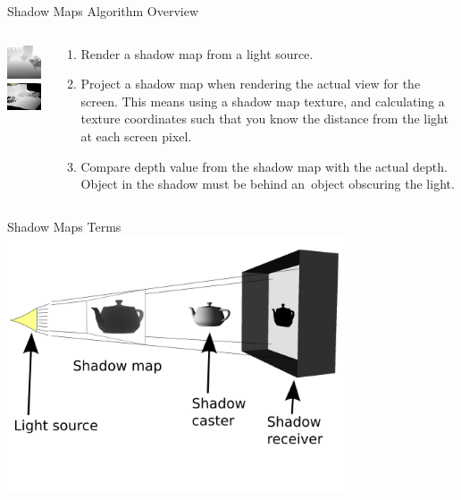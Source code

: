 \documentclass{beamer}
\begin{document}
\begin{frame}{Shadow Maps Algorithm Overview}
  \begin{columns}[T]
    \begin{column}{1.0in}
      \includegraphics[width=1.2in]{../depths_light_mapped.png}\\
      \vskip10pt
      \includegraphics[width=1.2in]{../depths_camera_mapped.png}
    \end{column}
    \begin{column}{3.0in}
      \begin{enumerate}
        \item Render a shadow map from a light source.
        \item Project a shadow map when rendering the actual view for the screen.
          This means using a shadow map texture, and calculating a texture
          coordinates such that you know the distance from the light
          at each screen pixel.
        \item Compare depth value from the shadow map with the actual depth.\\
          \alert{Object in the shadow must be behind an~object obscuring the light.}
      \end{enumerate}
    \end{column}
  \end{columns}
\end{frame}

\begin{frame}{Shadow Maps Terms}
\includegraphics[width=4in]{teapot_final.png}
\end{frame}
\end{document}
